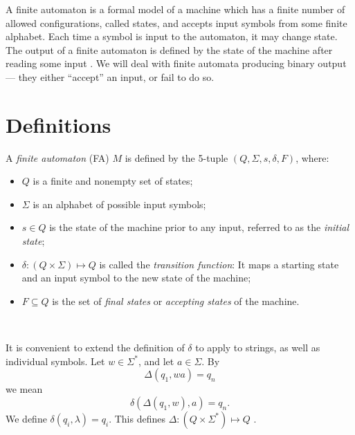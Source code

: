 \documentclass{bcthesis}
\renewcommand{\meo}[1]{}
\newcommand{\footcite}[2]{\xspace\cite[pg.~{#2}]{#1}\xspace}
\begin{document}
\label{ch:finite_automata}

	A finite automaton is a formal model of a machine which has a finite number of allowed configurations, called states, and accepts input symbols from some finite alphabet. 
	Each time a symbol is input to the automaton, it may change state. 
	The output of a finite automaton is defined by the state of the machine after reading some input \footcite{hopcroft}{13}.
	We will deal with finite automata producing binary output --- they either ``accept'' an input, or fail to do so.

	\section{Definitions} %
	\label{sec:fa_definitions}

		\begin{definition}
			A \textit{finite automaton} (FA) $M$ is defined by the 5-tuple $(Q, \Sigma, s, \delta, F)$, where:
			\begin{itemize}
				\item [] $Q$ is a finite and nonempty set of states;
				\item [] $\Sigma$ is an alphabet of possible input symbols;
				\item [] $s \in Q$ is the state of the machine prior to any input, referred to as the \textit{initial state};
				\item [] $\delta: (Q \times \Sigma) \mapsto Q$ is called the \textit{transition function}: It maps a starting state and an input symbol to the new state of the machine;
				\item [] $F \subseteq Q$ is the set of \textit{final states} or \textit{accepting states} of the machine.
			\end{itemize}
			\footcite{hopcroft}{17}~\meo{todo: something about this citation}
		\end{definition}

		\begin{remark}
			It is convenient to extend the definition of $\delta$ to apply to strings, as well as individual symbols.
			Let $w \in \Sigma^*$, and let $a \in \Sigma$.
			By 
			\[
				\Delta(q_1, wa) = q_n
			\] 
			we mean 
			\[
				\delta( \Delta(q_1, w), a) = q_n.
			\]
			We define $\delta(q_i, \lambda) = q_i$.
			This defines $\Delta: (Q \times \Sigma^*) \mapsto Q$ \footcite{hopcroft}{17}.
		\end{remark}
\end{document}
